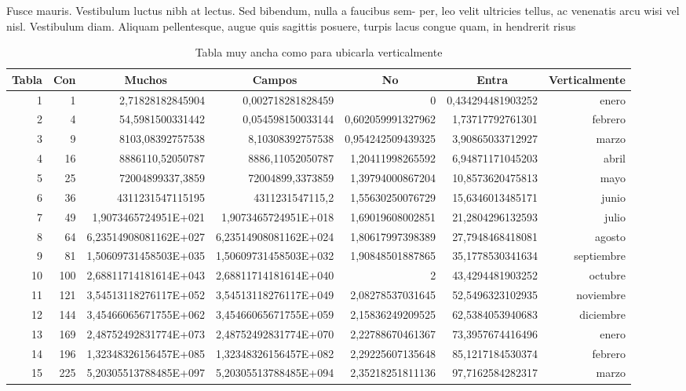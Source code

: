 \documentclass[11pt,a4paper]{article}
\begin{document}
Fusce mauris. Vestibulum luctus nibh at lectus. Sed bibendum, nulla a faucibus sem-
per, leo velit ultricies tellus, ac venenatis arcu wisi vel nisl. Vestibulum diam. Aliquam
pellentesque, augue quis sagittis posuere, turpis lacus congue quam, in hendrerit risus


\begin{landscape}
\vspace*{\fill}
\begin{table}[t]
\centering
\begin{tabular}{|r|r|r|r|r|r|r|}
\hline
\multicolumn{1}{|c|}{Tabla} & \multicolumn{1}{|c|}{Con} & \multicolumn{1}{|c|}{Muchos} & \multicolumn{1}{|c|}{Campos} & \multicolumn{1}{|c|}{No} & \multicolumn{1}{|c|}{Entra} & \multicolumn{1}{|c|}{Verticalmente} \\ \hline
1 & 1 & 2,71828182845904 & 0,002718281828459 & 0 & 0,434294481903252 & enero \\
2 & 4 & 54,5981500331442 & 0,054598150033144 & 0,602059991327962 & 1,73717792761301 & febrero \\
3 & 9 & 8103,08392757538 & 8,10308392757538 & 0,954242509439325 & 3,90865033712927 & marzo \\
4 & 16 & 8886110,52050787 & 8886,11052050787 & 1,20411998265592 & 6,94871171045203 & abril \\
5 & 25 & 72004899337,3859 & 72004899,3373859 & 1,39794000867204 & 10,8573620475813 & mayo \\
6 & 36 & 4311231547115195 & 4311231547115,2 & 1,55630250076729 & 15,6346013485171 & junio \\
7 & 49 & 1,9073465724951E+021 & 1,9073465724951E+018 & 1,69019608002851 & 21,2804296132593 & julio \\
8 & 64 & 6,23514908081162E+027 & 6,23514908081162E+024 & 1,80617997398389 & 27,7948468418081 & agosto \\
9 & 81 & 1,50609731458503E+035 & 1,50609731458503E+032 & 1,90848501887865 & 35,1778530341634 & septiembre \\
10 & 100 & 2,68811714181614E+043 & 2,68811714181614E+040 & 2 & 43,4294481903252 & octubre \\
11 & 121 & 3,54513118276117E+052 & 3,54513118276117E+049 & 2,08278537031645 & 52,5496323102935 & noviembre \\
12 & 144 & 3,45466065671755E+062 & 3,45466065671755E+059 & 2,15836249209525 & 62,5384053940683 & diciembre \\
13 & 169 & 2,48752492831774E+073 & 2,48752492831774E+070 & 2,22788670461367 & 73,3957674416496 & enero \\
14 & 196 & 1,32348326156457E+085 & 1,32348326156457E+082 & 2,29225607135648 & 85,1217184530374 & febrero \\
15 & 225 & 5,20305513788485E+097 & 5,20305513788485E+094 & 2,35218251811136 & 97,7162584282317 & marzo \\
\hline 
\end{tabular}
\caption{Tabla muy ancha como para ubicarla verticalmente}
\end{table}
\vspace*{\fill}
\end{landscape}
\end{document}
